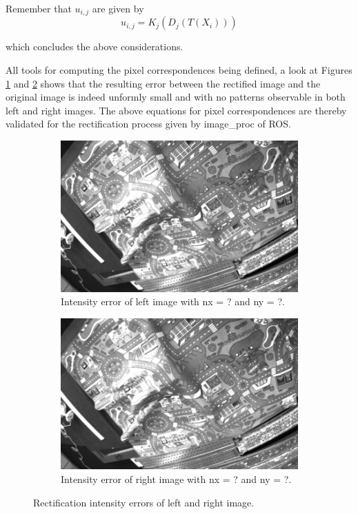 Remember that $u_{i,j}$ are given by 
\begin{equation}
  u_{i,j} = K_j (D_j(T(X_i)))
  \label{eqn/rect/u_def}
\end{equation}

which concludes the above considerations.

All tools for computing the pixel correspondences being defined, a look at 
Figures \ref{fig:rect_r1} and \ref{fig:rect_r2} shows that the resulting error
between the rectified image and the original image is indeed unformly 
small and with no patterns observable in both left and right images.
The above equations for pixel correspondences are thereby validated for the 
rectification process given by image\_proc of ROS.

\begin{figure}[h]
  \centering
  \begin{subfigure}[b]{0.49\textwidth}
    \includegraphics[width=\textwidth]{figures/rect_r1.jpg} 
    \caption{Intensity error of left image with nx = ? and ny = ?.}
    \label{fig:rect_r1}
  \end{subfigure}
  \begin{subfigure}[b]{0.49\textwidth}
    \includegraphics[width=\textwidth]{figures/rect_r2.jpg} 
    \caption{Intensity error of right image with nx = ? and ny = ?.}
    \label{fig:rect_r2}
  \end{subfigure}
  \caption{Rectification intensity errors of left and right image.}
  \label{fig:rect}
\end{figure}


